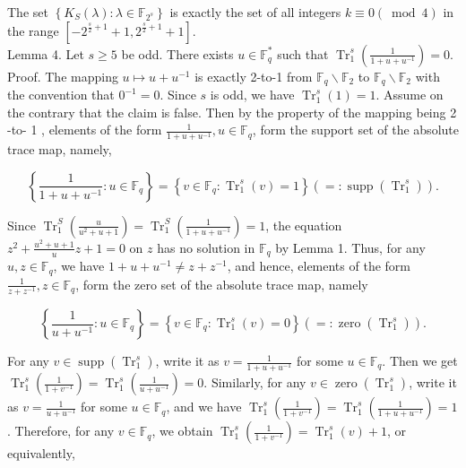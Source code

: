 \documentclass[10pt]{article}
\begin{document}
The set $\left\{K_{S}(\lambda): \lambda \in \mathbb{F}_{2^{s}}\right\}$ is exactly the set of all integers $k \equiv 0(\bmod 4)$ in the range $\left[-2^{\frac{s}{2}+1}+1,2^{\frac{s}{2}+1}+1\right]$.\\
Lemma 4. Let $s \geqslant 5$ be odd. There exists $u \in \mathbb{F}_{q}^{*}$ such that $\operatorname{Tr}_{1}^{s}\left(\frac{1}{1+u+u^{-1}}\right)=0$.\\
Proof. The mapping $u \mapsto u+u^{-1}$ is exactly 2-to-1 from $\mathbb{F}_{q} \backslash \mathbb{F}_{2}$ to $\mathbb{F}_{q} \backslash \mathbb{F}_{2}$ with the convention that $0^{-1}=0$. Since $s$ is odd, we have $\operatorname{Tr}_{1}^{s}(1)=1$. Assume on the contrary that the claim is false. Then by the property of the mapping being 2 -to- 1 , elements of the form $\frac{1}{1+u+u^{-1}}, u \in \mathbb{F}_{q}$, form the support set of the absolute trace map, namely,

$$
\left\{\frac{1}{1+u+u^{-1}}: u \in \mathbb{F}_{q}\right\}=\left\{v \in \mathbb{F}_{q}: \operatorname{Tr}_{1}^{s}(v)=1\right\}\left(=: \operatorname{supp}\left(\operatorname{Tr}_{1}^{s}\right)\right) .
$$

Since $\operatorname{Tr}_{1}^{S}\left(\frac{u}{u^{2}+u+1}\right)=\operatorname{Tr}_{1}^{S}\left(\frac{1}{1+u+u^{-1}}\right)=1$, the equation $z^{2}+\frac{u^{2}+u+1}{u} z+1=0$ on $z$ has no solution in $\mathbb{F}_{q}$ by Lemma 1. Thus, for any $u, z \in \mathbb{F}_{q}$, we have $1+u+u^{-1} \neq z+z^{-1}$, and hence, elements of the form $\frac{1}{z+z^{-1}}, z \in \mathbb{F}_{q}$, form the zero set of the absolute trace map, namely

$$
\left\{\frac{1}{u+u^{-1}}: u \in \mathbb{F}_{q}\right\}=\left\{v \in \mathbb{F}_{q}: \operatorname{Tr}_{1}^{s}(v)=0\right\}\left(=: \operatorname{zero}\left(\operatorname{Tr}_{1}^{s}\right)\right) .
$$

For any $v \in \operatorname{supp}\left(\operatorname{Tr}_{1}^{s}\right)$, write it as $v=\frac{1}{1+u+u^{-1}}$ for some $u \in \mathbb{F}_{q}$. Then we get $\operatorname{Tr}_{1}^{s}\left(\frac{1}{1+v^{-1}}\right)= \operatorname{Tr}_{1}^{s}\left(\frac{1}{u+u^{-1}}\right)=0$. Similarly, for any $v \in \operatorname{zero}\left(\operatorname{Tr}_{1}^{s}\right)$, write it as $v=\frac{1}{u+u^{-1}}$ for some $u \in \mathbb{F}_{q}$, and we have $\operatorname{Tr}_{1}^{s}\left(\frac{1}{1+v^{-1}}\right)=\operatorname{Tr}_{1}^{s}\left(\frac{1}{1+u+u^{-1}}\right)=1$. Therefore, for any $v \in \mathbb{F}_{q}$, we obtain $\operatorname{Tr}_{1}^{s}\left(\frac{1}{1+v^{-1}}\right)=\operatorname{Tr}_{1}^{s}(v)+1$, or equivalently,
\end{document}
